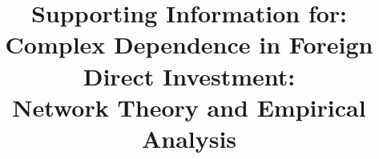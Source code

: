 \documentclass[reqno,onecolumn,letterpaper,12pt]{article}
\begin{document}
\title{{\bf Supporting Information for:} \\Complex Dependence in Foreign Direct Investment: \\Network Theory and Empirical Analysis} %
\date{}
\maketitle
\end{document}

